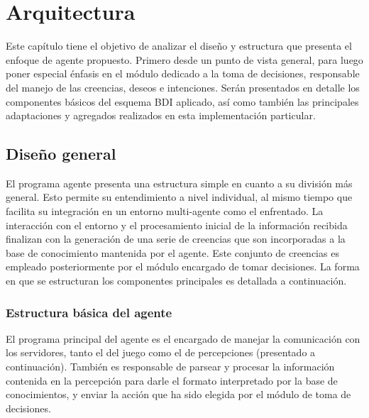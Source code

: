 \documentclass[oneside]{book}
\theoremstyle{definition}
\theoremstyle{example}
\begin{document}
\chapter{Arquitectura} %

Este capítulo tiene el objetivo de analizar el diseño y estructura que presenta el 
enfoque de agente propuesto. Primero desde un punto de vista general, para luego 
poner especial énfasis en el módulo dedicado a la toma de decisiones, responsable 
del manejo de las creencias, deseos e intenciones. Serán presentados en detalle los 
componentes básicos del esquema BDI aplicado, así como también las principales 
adaptaciones y agregados realizados en esta implementación particular.

\section{Diseño general}


El programa agente presenta una estructura simple en cuanto a su división más general. 
Esto permite su entendimiento a nivel individual, al mismo tiempo que facilita su 
integración en un entorno multi-agente como el enfrentado. La interacción con el entorno 
y el procesamiento inicial de la información recibida finalizan con la generación de una 
serie de creencias que son incorporadas a la base de conocimiento mantenida por el agente. 
Este conjunto de creencias es empleado posteriormente por el módulo encargado de tomar 
decisiones. La forma en que se estructuran los componentes principales es detallada a 
continuación.

\subsection{Estructura básica del agente}


El programa principal del agente es el encargado de manejar la comunicación con los 
servidores, tanto el del juego como el de percepciones (presentado 
a continuación). También es responsable de parsear y procesar la información contenida 
en la percepción para darle el formato interpretado por la base de conocimientos, y 
enviar la acción que ha sido elegida por el módulo de toma de decisiones.
\end{document}
